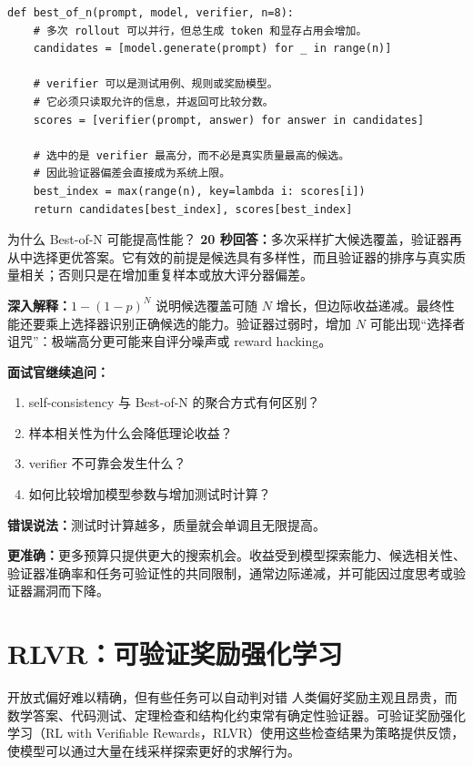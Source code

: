 \begin{lstlisting}
def best_of_n(prompt, model, verifier, n=8):
    # 多次 rollout 可以并行，但总生成 token 和显存占用会增加。
    candidates = [model.generate(prompt) for _ in range(n)]

    # verifier 可以是测试用例、规则或奖励模型。
    # 它必须只读取允许的信息，并返回可比较分数。
    scores = [verifier(prompt, answer) for answer in candidates]

    # 选中的是 verifier 最高分，而不必是真实质量最高的候选。
    # 因此验证器偏差会直接成为系统上限。
    best_index = max(range(n), key=lambda i: scores[i])
    return candidates[best_index], scores[best_index]
\end{lstlisting}

\begin{interviewbox}{为什么 Best-of-N 可能提高性能？}
\textbf{20 秒回答：}多次采样扩大候选覆盖，验证器再从中选择更优答案。它有效的前提是候选具有多样性，而且验证器的排序与真实质量相关；否则只是在增加重复样本或放大评分器偏差。

\textbf{深入解释：}$1-(1-p)^N$ 说明候选覆盖可随 $N$ 增长，但边际收益递减。最终性能还要乘上选择器识别正确候选的能力。验证器过弱时，增加 $N$ 可能出现“选择者诅咒”：极端高分更可能来自评分噪声或 reward hacking。

\textbf{面试官继续追问：}
\begin{enumerate}
  \item self-consistency 与 Best-of-N 的聚合方式有何区别？
  \item 样本相关性为什么会降低理论收益？
  \item verifier 不可靠会发生什么？
  \item 如何比较增加模型参数与增加测试时计算？
\end{enumerate}
\end{interviewbox}

\begin{wrongbox}
\textbf{错误说法：}测试时计算越多，质量就会单调且无限提高。

\textbf{更准确：}更多预算只提供更大的搜索机会。收益受到模型探索能力、候选相关性、验证器准确率和任务可验证性的共同限制，通常边际递减，并可能因过度思考或验证器漏洞而下降。
\end{wrongbox}

\chapter{RLVR：可验证奖励强化学习}
\label{sec:rlvr}

\begin{motivationbox}{开放式偏好难以精确，但有些任务可以自动判对错}
人类偏好奖励主观且昂贵，而数学答案、代码测试、定理检查和结构化约束常有确定性验证器。可验证奖励强化学习（RL with Verifiable Rewards，RLVR）使用这些检查结果为策略提供反馈，使模型可以通过大量在线采样探索更好的求解行为。
\end{motivationbox}

